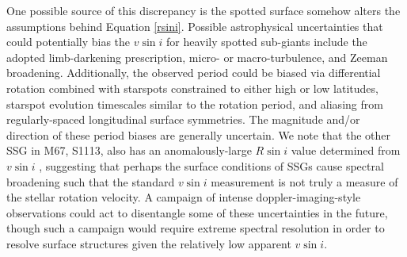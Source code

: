 \documentclass[trackchanges]{aastex631}
\begin{document}
One possible source of this discrepancy is the spotted surface somehow alters the assumptions behind Equation \ref{rsini}. Possible astrophysical uncertainties that could potentially bias the $v\sin{i}$ for heavily spotted sub-giants include the adopted limb-darkening prescription, micro- or macro-turbulence, and Zeeman broadening. Additionally, the observed period could be biased via differential rotation combined with starspots constrained to either high or low latitudes, starspot evolution timescales similar to the rotation period, and aliasing from regularly-spaced longitudinal surface symmetries. The magnitude and/or direction of these period biases are generally uncertain. We note that the other SSG in M67, S1113, also has an anomalously-large $R\sin{i}$ value determined from $v\sin{i}$ \citep{mathieu03}, suggesting that perhaps the surface conditions of SSGs cause spectral broadening such that the standard $v\sin{i}$ measurement is not truly a measure of the stellar rotation velocity. A campaign of intense doppler-imaging-style observations could act to disentangle some of these uncertainties in the future, though such a campaign would require extreme spectral resolution in order to resolve surface structures given the relatively low apparent $v\sin{i}$.

\end{document}
